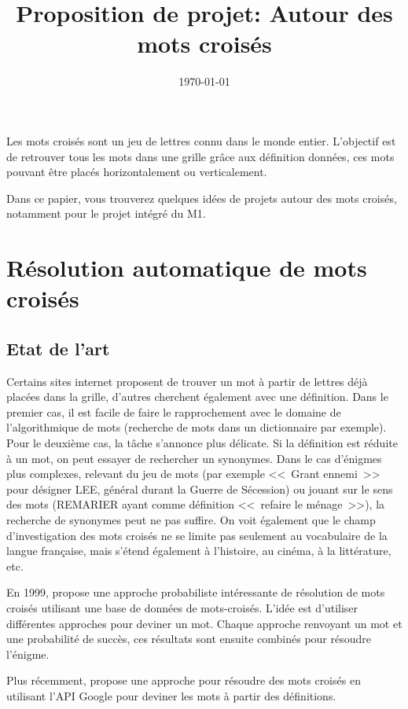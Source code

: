 \documentclass{article}
\title{Proposition de projet: Autour des mots croisés}
\author{}
\date{\today}
\begin{document}
\maketitle

Les mots croisés sont un jeu de lettres connu dans le monde entier. L'objectif est de retrouver tous les mots dans une grille grâce aux définition données, ces mots pouvant être placés horizontalement ou verticalement.

Dans ce papier, vous trouverez quelques idées de projets autour des mots croisés, notamment pour le projet intégré du M1.

\section{Résolution automatique de mots croisés}

\subsection{Etat de l'art}

Certains sites internet proposent de trouver un mot à partir de lettres déjà placées dans la grille, d'autres cherchent également avec une définition. Dans le premier cas, il est facile de faire le rapprochement avec le domaine de l'algorithmique de mots (recherche de mots dans un dictionnaire par exemple). Pour le deuxième cas, la tâche s'annonce plus délicate. Si la définition est réduite à un mot, on peut essayer de rechercher un synonymes. Dans le cas d'énigmes plus complexes, relevant du jeu de mots (par exemple <<~Grant ennemi~>> pour désigner LEE, général durant la Guerre de Sécession) ou jouant sur le sens des mots (REMARIER ayant comme définition <<~refaire le ménage~>>), la recherche de synonymes peut ne pas suffire. On voit également que le champ d'investigation des mots croisés ne se limite pas seulement au vocabulaire de la langue française, mais s'étend également à l'histoire, au cinéma, à la littérature, etc.

En 1999, \cite{proverb} propose une approche probabiliste intéressante de résolution de mots croisés utilisant une base de données de mots-croisés. L'idée est d'utiliser différentes approches pour deviner un mot. Chaque approche renvoyant un mot et une probabilité de succès, ces résultats sont ensuite combinés pour résoudre l'énigme.

Plus récemment, \cite{GCV} propose une approche pour résoudre des mots croisés en utilisant l'API Google pour deviner les mots à partir des définitions.
\end{document}
